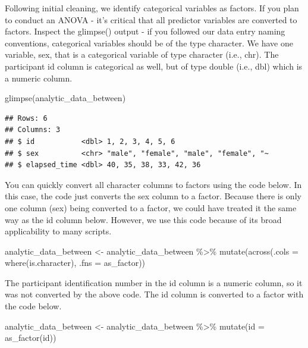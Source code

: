 \documentclass[
]{krantz}
\makeatletter
\newenvironment{Shaded}{\begin{snugshade}}{\end{snugshade}}
\newcommand{\AttributeTok}[1]{\textcolor[rgb]{0.61,0.61,0.61}{#1}}
\newcommand{\FunctionTok}[1]{\textcolor[rgb]{0,0,0}{#1}}
\newcommand{\NormalTok}[1]{#1}
\newcommand{\OtherTok}[1]{\textcolor[rgb]{0.37,0.37,0.37}{#1}}
\newcommand{\SpecialCharTok}[1]{\textcolor[rgb]{0,0,0}{#1}}
\newenvironment{kframe}{%
\medskip{}
\setlength{\fboxsep}{.8em}
 \def\at@end@of@kframe{}%
 \ifinner\ifhmode%
  \def\at@end@of@kframe{\end{minipage}}%
  \begin{minipage}{\columnwidth}%
 \fi\fi%
 \def\FrameCommand##1{\hskip\@totalleftmargin \hskip-\fboxsep
 \colorbox{shadecolor}{##1}\hskip-\fboxsep
     \hskip-\linewidth \hskip-\@totalleftmargin \hskip\columnwidth}%
 \MakeFramed {\advance\hsize-\width
   \@totalleftmargin\z@ \linewidth\hsize
   \@setminipage}}%
 {\par\unskip\endMakeFramed%
 \at@end@of@kframe}
\renewenvironment{Shaded}{\begin{kframe}}{\end{kframe}}
\makeatother
\begin{document}
Following initial cleaning, we identify categorical variables as factors. If you plan to conduct an ANOVA - it's critical that all predictor variables are converted to factors. Inspect the glimpse() output - if you followed our data entry naming conventions, categorical variables should be of the type character. We have one variable, sex, that is a categorical variable of type character (i.e., chr). The participant id column is categorical as well, but of type double (i.e., dbl) which is a numeric column.

\begin{Shaded}
\begin{Highlighting}[]
\FunctionTok{glimpse}\NormalTok{(analytic\_data\_between)}
\end{Highlighting}
\end{Shaded}

\begin{verbatim}
## Rows: 6
## Columns: 3
## $ id           <dbl> 1, 2, 3, 4, 5, 6
## $ sex          <chr> "male", "female", "male", "female", "~
## $ elapsed_time <dbl> 40, 35, 38, 33, 42, 36
\end{verbatim}

You can quickly convert all character columns to factors using the code below. In this case, the code just converts the sex column to a factor. Because there is only one column (sex) being converted to a factor, we could have treated it the same way as the id column below. However, we use this code because of its broad applicability to many scripts.

\begin{Shaded}
\begin{Highlighting}[]
\NormalTok{analytic\_data\_between }\OtherTok{\textless{}{-}}\NormalTok{ analytic\_data\_between }\SpecialCharTok{\%\textgreater{}\%}
  \FunctionTok{mutate}\NormalTok{(}\FunctionTok{across}\NormalTok{(}\AttributeTok{.cols =} \FunctionTok{where}\NormalTok{(is.character),}
                \AttributeTok{.fns =}\NormalTok{ as\_factor))}
\end{Highlighting}
\end{Shaded}

The participant identification number in the id column is a numeric column, so it was not converted by the above code. The id column is converted to a factor with the code below.

\begin{Shaded}
\begin{Highlighting}[]
\NormalTok{analytic\_data\_between }\OtherTok{\textless{}{-}}\NormalTok{ analytic\_data\_between }\SpecialCharTok{\%\textgreater{}\%}
  \FunctionTok{mutate}\NormalTok{(}\AttributeTok{id =} \FunctionTok{as\_factor}\NormalTok{(id))}
\end{Highlighting}
\end{Shaded}
\end{document}
